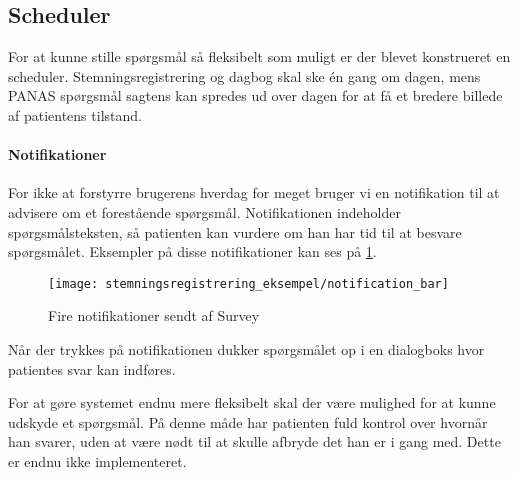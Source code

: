 \subsection{Scheduler}
For at kunne stille spørgsmål så fleksibelt som muligt er der blevet konstrueret en scheduler.
Stemningsregistrering og dagbog skal ske én gang om dagen, mens PANAS spørgsmål sagtens kan spredes ud over dagen for at få et bredere billede af patientens tilstand.


\paragraph{Notifikationer}
For ikke at forstyrre brugerens hverdag for meget bruger vi en notifikation til at advisere om et forestående spørgsmål.
Notifikationen indeholder spørgsmålsteksten, så patienten kan vurdere om han har tid til at besvare spørgsmålet.
Eksempler på disse notifikationer kan ses på \cref{noti}.

\begin{figure}
	\centering
	\texttt{[image: stemningsregistrering\_eksempel/notification\_bar]}
	\caption{Fire notifikationer sendt af Survey}\label{noti}
\end{figure}

Når der trykkes på notifikationen dukker spørgsmålet op i en dialogboks hvor patientes svar kan indføres.

For at gøre systemet endnu mere fleksibelt skal der være mulighed for at kunne udskyde et spørgsmål.
På denne måde har patienten fuld kontrol over hvornår han svarer, uden at være nødt til at skulle afbryde det han er i gang med.
Dette er endnu ikke implementeret.